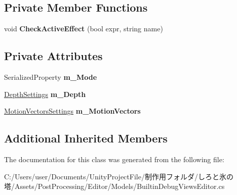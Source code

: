 \subsection*{Private Member Functions}
\begin{DoxyCompactItemize}
\item 
\mbox{\label{class_unity_editor_1_1_post_processing_1_1_builtin_debug_views_editor_a9aeed14b04739e7f01b5f80d6c192b7f}} 
void {\bfseries Check\+Active\+Effect} (bool expr, string name)
\end{DoxyCompactItemize}
\subsection*{Private Attributes}
\begin{DoxyCompactItemize}
\item 
\mbox{\label{class_unity_editor_1_1_post_processing_1_1_builtin_debug_views_editor_a8d9e2dd834ed889aff02e635e452f7b4}} 
Serialized\+Property {\bfseries m\+\_\+\+Mode}
\item 
\mbox{\label{class_unity_editor_1_1_post_processing_1_1_builtin_debug_views_editor_a3a17b342fbe1f3fef769523cb0c2d66e}} 
\hyperlink{struct_unity_editor_1_1_post_processing_1_1_builtin_debug_views_editor_1_1_depth_settings}{Depth\+Settings} {\bfseries m\+\_\+\+Depth}
\item 
\mbox{\label{class_unity_editor_1_1_post_processing_1_1_builtin_debug_views_editor_a10008c45ab1472475ed6f7aa71bc9201}} 
\hyperlink{struct_unity_editor_1_1_post_processing_1_1_builtin_debug_views_editor_1_1_motion_vectors_settings}{Motion\+Vectors\+Settings} {\bfseries m\+\_\+\+Motion\+Vectors}
\end{DoxyCompactItemize}
\subsection*{Additional Inherited Members}


The documentation for this class was generated from the following file\+:\begin{DoxyCompactItemize}
\item 
C\+:/\+Users/user/\+Documents/\+Unity\+Project\+File/制作用フォルダ/しろと氷の塔/\+Assets/\+Post\+Processing/\+Editor/\+Models/Builtin\+Debug\+Views\+Editor.\+cs\end{DoxyCompactItemize}
